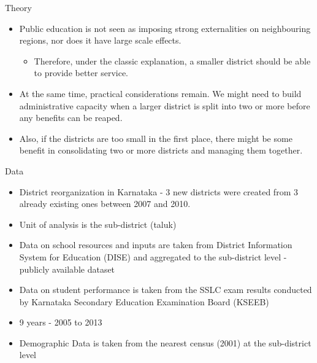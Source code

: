 \documentclass{beamer}
\begin{document}
		\begin{frame}{Theory}
			\begin{itemize}
				\item Public education is not seen as imposing strong externalities on neighbouring regions, nor does it have large scale effects. 
				\begin{itemize}
					\item Therefore, under the classic explanation, a smaller district should be able to provide better service.
				\end{itemize}
				\item At the same time, practical considerations remain. We might need to build administrative capacity when a larger district is split into two or more before any benefits can be reaped. \item Also, if the districts are too small in the first place, there might be some benefit in consolidating two or more districts and managing them together.  
				
			\end{itemize}
		\end{frame}
		
		\begin{frame}{Data}
			\begin{itemize}
				\item District reorganization in Karnataka - 3 new districts were created from 3 already existing ones between 2007 and 2010.
				\item Unit of analysis is the sub-district (taluk)
				\item Data on school resources and inputs are taken from District Information System for Education (DISE) and aggregated to the sub-district level - publicly available dataset
				\item Data on student performance is taken from the SSLC exam results conducted by Karnataka Secondary Education Examination Board (KSEEB)
				\item 9 years - 2005 to 2013
				\item Demographic Data is taken from the nearest census (2001) at the sub-district level
				
				
			\end{itemize}
		\end{frame}
		
\end{document}
